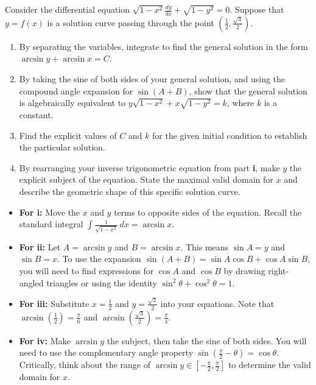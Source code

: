 \begin{problem}
Consider the differential equation $\sqrt{1-x^2} \frac{dy}{dx} + \sqrt{1-y^2} = 0$.
Suppose that $y = f(x)$ is a solution curve passing through the point $\left(\frac{1}{2}, \frac{\sqrt{3}}{2}\right)$.

\begin{enumerate}
    \item[\textbf{i}] By separating the variables, integrate to find the general solution in the form $\arcsin y + \arcsin x = C$.
    \item[\textbf{ii}] By taking the sine of both sides of your general solution, and using the compound angle expansion for $\sin(A+B)$, show that the general solution is algebraically equivalent to $y\sqrt{1-x^2} + x\sqrt{1-y^2} = k$, where $k$ is a constant.
    \item[\textbf{iii}] Find the explicit values of $C$ and $k$ for the given initial condition to establish the particular solution.
    \item[\textbf{iv}] By rearranging your inverse trigonometric equation from part \textbf{i}, make $y$ the explicit subject of the equation. State the maximal valid domain for $x$ and describe the geometric shape of this specific solution curve.
\end{enumerate}
\end{problem}

\begin{hint}
\begin{itemize}
    \item \textbf{For i:} Move the $x$ and $y$ terms to opposite sides of the equation. Recall the standard integral $\int \frac{1}{\sqrt{1-x^2}} \, dx = \arcsin x$.
    \item \textbf{For ii:} Let $A = \arcsin y$ and $B = \arcsin x$. This means $\sin A = y$ and $\sin B = x$. To use the expansion $\sin(A+B) = \sin A \cos B + \cos A \sin B$, you will need to find expressions for $\cos A$ and $\cos B$ by drawing right-angled triangles or using the identity $\sin^2\theta + \cos^2\theta = 1$.
    \item \textbf{For iii:} Substitute $x = \frac{1}{2}$ and $y = \frac{\sqrt{3}}{2}$ into your equations. Note that $\arcsin\left(\frac{1}{2}\right) = \frac{\pi}{6}$ and $\arcsin\left(\frac{\sqrt{3}}{2}\right) = \frac{\pi}{3}$.
    \item \textbf{For iv:} Make $\arcsin y$ the subject, then take the sine of both sides. You will need to use the complementary angle property $\sin\left(\frac{\pi}{2} - \theta\right) = \cos\theta$. Critically, think about the range of $\arcsin y \in [-\frac{\pi}{2}, \frac{\pi}{2}]$ to determine the valid domain for $x$.
\end{itemize}
\end{hint}

